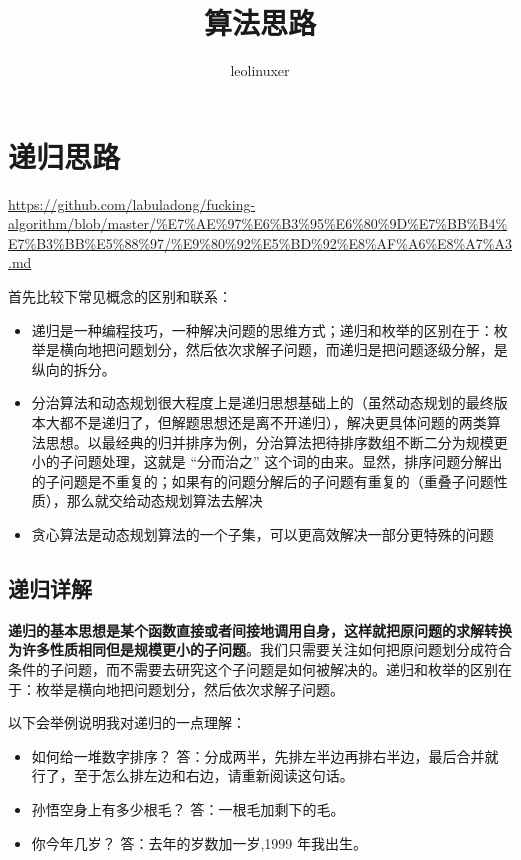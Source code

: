 \documentclass[12pt]{article}
\title{算法思路}
\author{leolinuxer}
\begin{document}
\maketitle
\tableofcontents

\section{递归思路}
\url{https://github.com/labuladong/fucking-algorithm/blob/master/%E7%AE%97%E6%B3%95%E6%80%9D%E7%BB%B4%E7%B3%BB%E5%88%97/%E9%80%92%E5%BD%92%E8%AF%A6%E8%A7%A3.md}

首先比较下常见概念的区别和联系：
\begin{itemize}
\setlength{\itemsep}{0pt}
\setlength{\parsep}{0pt}
\setlength{\parskip}{0pt}
    \item 递归是一种编程技巧，一种解决问题的思维方式；递归和枚举的区别在于：枚举是横向地把问题划分，然后依次求解子问题，而递归是把问题逐级分解，是纵向的拆分。
    \item 分治算法和动态规划很大程度上是递归思想基础上的（虽然动态规划的最终版本大都不是递归了，但解题思想还是离不开递归），解决更具体问题的两类算法思想。以最经典的归并排序为例，分治算法把待排序数组不断二分为规模更小的子问题处理，这就是 “分而治之” 这个词的由来。显然，排序问题分解出的子问题是不重复的；如果有的问题分解后的子问题有重复的（重叠子问题性质），那么就交给动态规划算法去解决
    \item 贪心算法是动态规划算法的一个子集，可以更高效解决一部分更特殊的问题
\end{itemize}

\subsection{递归详解}
\textbf{递归的基本思想是某个函数直接或者间接地调用自身，这样就把原问题的求解转换为许多性质相同但是规模更小的子问题}。我们只需要关注如何把原问题划分成符合条件的子问题，而不需要去研究这个子问题是如何被解决的。递归和枚举的区别在于：枚举是横向地把问题划分，然后依次求解子问题。

以下会举例说明我对递归的一点理解：
\begin{itemize}
\setlength{\itemsep}{0pt}
\setlength{\parsep}{0pt}
\setlength{\parskip}{0pt}
    \item 如何给一堆数字排序？ 答：分成两半，先排左半边再排右半边，最后合并就行了，至于怎么排左边和右边，请重新阅读这句话。
    \item 孙悟空身上有多少根毛？ 答：一根毛加剩下的毛。
    \item 你今年几岁？ 答：去年的岁数加一岁,1999 年我出生。
\end{itemize}
\end{document}

